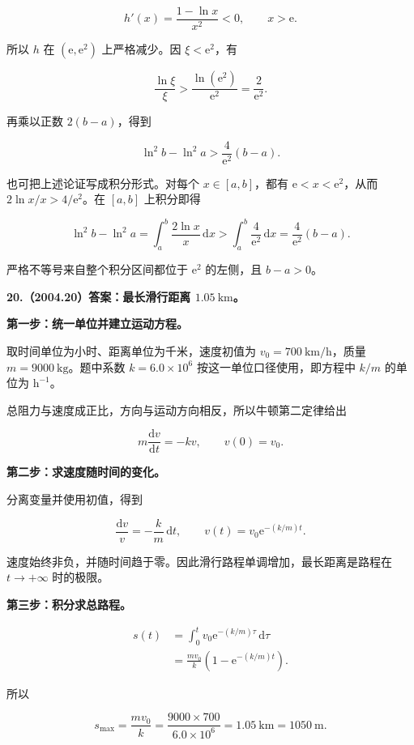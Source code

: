 \documentclass[UTF8,11pt,fontset=windows]{ctexart}
\begin{document}
$$
h'(x)=\frac{1-\ln x}{x^2}<0,\qquad x>\mathrm e.
$$

所以 $h$ 在 $(\mathrm e,\mathrm e^2)$ 上严格减少。因 $\xi<\mathrm e^2$，有

$$
\frac{\ln\xi}{\xi}>\frac{\ln(\mathrm e^2)}{\mathrm e^2}=\frac2{\mathrm e^2}.
$$

再乘以正数 $2(b-a)$，得到

$$
\ln^2b-\ln^2a>\frac4{\mathrm e^2}(b-a).
$$

也可把上述论证写成积分形式。对每个 $x\in[a,b]$，都有 $\mathrm e<x<\mathrm e^2$，从而 $2\ln x/x>4/\mathrm e^2$。在 $[a,b]$ 上积分即得

$$
\ln^2b-\ln^2a
=\int_a^b\frac{2\ln x}{x}\,\mathrm dx
>\int_a^b\frac4{\mathrm e^2}\,\mathrm dx
=\frac4{\mathrm e^2}(b-a).
$$

严格不等号来自整个积分区间都位于 $\mathrm e^2$ 的左侧，且 $b-a>0$。

\clearpage

\textbf{20.（2004.20）答案：最长滑行距离 $1.05\ \mathrm{km}$。}

\textbf{第一步：统一单位并建立运动方程。}

取时间单位为小时、距离单位为千米，速度初值为 $v_0=700\ \mathrm{km/h}$，质量 $m=9000\ \mathrm{kg}$。题中系数 $k=6.0\times10^6$ 按这一单位口径使用，即方程中 $k/m$ 的单位为 $\mathrm h^{-1}$。

总阻力与速度成正比，方向与运动方向相反，所以牛顿第二定律给出

$$
m\frac{\mathrm dv}{\mathrm dt}=-kv,
\qquad v(0)=v_0.
$$

\textbf{第二步：求速度随时间的变化。}

分离变量并使用初值，得到

$$
\frac{\mathrm dv}{v}=-\frac km\,\mathrm dt,
\qquad
v(t)=v_0\mathrm e^{-(k/m)t}.
$$

速度始终非负，并随时间趋于零。因此滑行路程单调增加，最长距离是路程在 $t\to+\infty$ 时的极限。

\textbf{第三步：积分求总路程。}

$$
\begin{aligned}
s(t)&=\int_0^t v_0\mathrm e^{-(k/m)\tau}\,\mathrm d\tau\\
&=\frac{mv_0}{k}\left(1-\mathrm e^{-(k/m)t}\right).
\end{aligned}
$$

所以

$$
s_{\max}=\frac{mv_0}{k}
=\frac{9000\times700}{6.0\times10^6}
=1.05\ \mathrm{km}=1050\ \mathrm m.
$$
\end{document}
